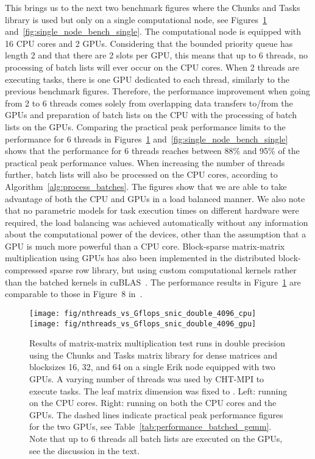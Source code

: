 \documentclass{elsarticle}
\begin{document}
This brings us to the next two benchmark figures where the Chunks and
Tasks library is used but only on a single computational node, see
Figures~\ref{fig:single_node_bench_double}
and~\ref{fig:single_node_bench_single}. The computational node is
equipped with 16 CPU cores and 2 GPUs.  Considering that the bounded
priority queue has length 2 and that there are 2 slots per GPU, this
means that up to 6 threads, no processing of batch lists will ever
occur on the CPU cores.  When 2 threads are executing tasks, there is
one GPU dedicated to each thread, similarly to the previous benchmark
figures.
Therefore, the performance improvement when going from 2 to 6 threads
comes solely from overlapping data transfers to/from the GPUs and
preparation of batch lists on the CPU with the processing of batch
lists on the GPUs. Comparing the practical peak performance limits to
the performance for 6 threads in
Figures~\ref{fig:single_node_bench_double}
and~\ref{fig:single_node_bench_single} shows that the performance for
6 threads reaches between 88\% and 95\% of the practical peak
performance values.
When increasing the number of threads
further, batch lists will also be processed on the CPU cores,
according to Algorithm~\ref{alg:process_batches}.  The figures show
that we are able to take advantage of both the CPU and GPUs in a load
balanced manner. We also note that no parametric models for task
execution times on different hardware were required, the load
balancing was achieved automatically without any information about the
computational power of the devices, other than the assumption that
a GPU is much more powerful than a CPU core. Block-sparse
matrix-matrix multiplication using GPUs has also been implemented in
the distributed block-compressed sparse row library, but using custom
computational kernels rather than the batched kernels in
cuBLAS~\cite{Borstnik2014}. The performance results in
Figure~\ref{fig:single_node_bench_double} are comparable to those in
Figure~8 in~\cite{Borstnik2014}.

\begin{figure}
  \begin{center}
    \texttt{[image: fig/nthreads\_vs\_Gflops\_snic\_double\_4096\_cpu]}
    \texttt{[image: fig/nthreads\_vs\_Gflops\_snic\_double\_4096\_gpu]}
  \end{center}
  \caption{Results of matrix-matrix multiplication test runs in double
    precision using the Chunks and Tasks matrix library for dense  matrices and blocksizes 16, 32, and 64 on a
    single Erik node equipped with two GPUs. A varying number of
    threads was used by CHT-MPI to execute tasks. The leaf matrix
    dimension was fixed to .  Left: running on the
    CPU cores. Right: running on both the CPU cores and the GPUs. The
    dashed lines indicate practical peak performance figures for the
    two GPUs, see Table~\ref{tab:performance_batched_gemm}. Note that
    up to 6 threads all batch lists are executed on the GPUs, see the
    discussion in the text. \label{fig:single_node_bench_double}}
\end{figure}
\end{document}
